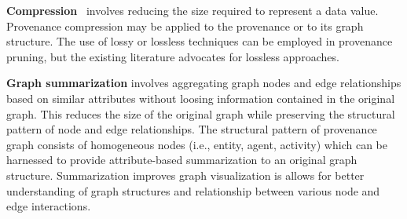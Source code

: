 \textbf{Compression}~\cite{xie11-tapp,hussain_secure_2014, 7038199} involves reducing the size required to represent a data value. Provenance compression may be applied to the provenance or to its graph structure. The use of lossy or lossless techniques can be employed in provenance pruning, but the existing literature advocates for lossless approaches.

\textbf{Graph summarization} involves aggregating graph nodes and edge relationships based on similar attributes without loosing information contained in the original graph. This reduces the size of the original graph while preserving the structural pattern of node and edge relationships. The structural pattern of provenance graph consists of homogeneous nodes (i.e., entity, agent, activity) which can be harnessed to provide attribute-based summarization to an original graph structure. Summarization improves graph visualization is allows for better understanding of graph structures and relationship between various node and edge interactions.

